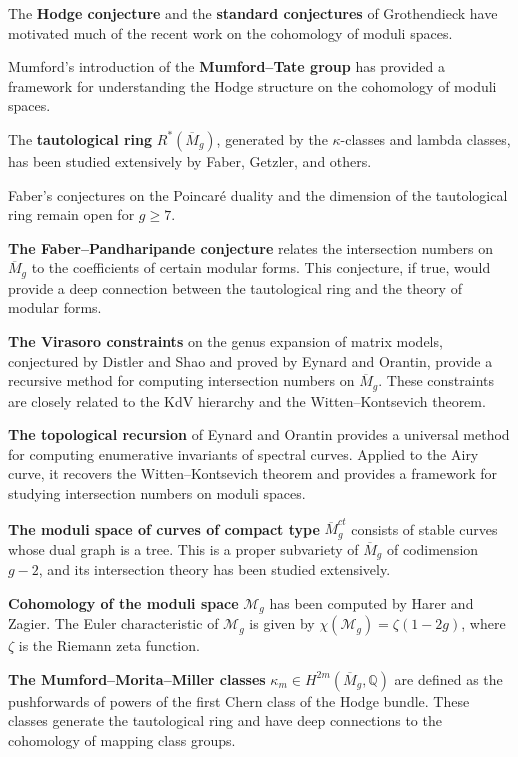 The \textbf{Hodge conjecture} and the \textbf{standard conjectures} of Grothendieck have motivated much of the recent work on the cohomology of moduli spaces.

Mumford's introduction of the \textbf{Mumford--Tate group} has provided a framework for understanding the Hodge structure on the cohomology of moduli spaces.

The \textbf{tautological ring} $R^*(\overline{M}_g)$, generated by the $\kappa$-classes and lambda classes, has been studied extensively by Faber, Getzler, and others.

Faber's conjectures on the Poincaré duality and the dimension of the tautological ring remain open for $g \geq 7$.

\textbf{The Faber--Pandharipande conjecture} relates the intersection numbers on $\overline{M}_g$ to the coefficients of certain modular forms. This conjecture, if true, would provide a deep connection between the tautological ring and the theory of modular forms.

\textbf{The Virasoro constraints} on the genus expansion of matrix models, conjectured by Distler and Shao and proved by Eynard and Orantin, provide a recursive method for computing intersection numbers on $\overline{M}_g$. These constraints are closely related to the KdV hierarchy and the Witten--Kontsevich theorem.

\textbf{The topological recursion} of Eynard and Orantin provides a universal method for computing enumerative invariants of spectral curves. Applied to the Airy curve, it recovers the Witten--Kontsevich theorem and provides a framework for studying intersection numbers on moduli spaces.

\textbf{The moduli space of curves of compact type} $\overline{M}_g^{ct}$ consists of stable curves whose dual graph is a tree. This is a proper subvariety of $\overline{M}_g$ of codimension $g-2$, and its intersection theory has been studied extensively.

\textbf{Cohomology of the moduli space} $\mathcal{M}_g$ has been computed by Harer and Zagier. The Euler characteristic of $\mathcal{M}_g$ is given by $\chi(\mathcal{M}_g) = \zeta(1-2g)$, where $\zeta$ is the Riemann zeta function.

\textbf{The Mumford--Morita--Miller classes} $\kappa_m \in H^{2m}(\overline{M}_g, \mathbb{Q})$ are defined as the pushforwards of powers of the first Chern class of the Hodge bundle. These classes generate the tautological ring and have deep connections to the cohomology of mapping class groups.

